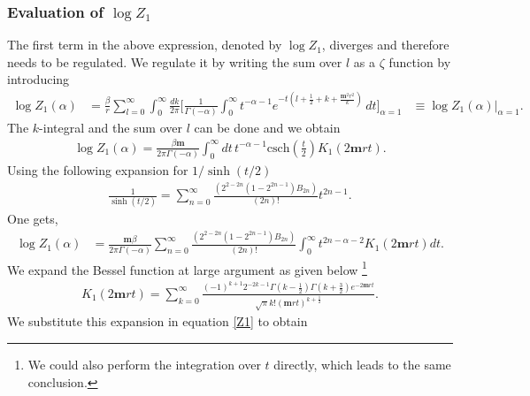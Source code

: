 \documentclass[a4paper,11pt]{article}
\begin{document}
\subsubsection*{Evaluation of $\log Z_1$}

The first term in the above expression, denoted by $\log Z_1$, diverges and  therefore needs to be regulated. 
We regulate it by writing the sum over $l$ as a $\zeta$ function by introducing 
\begin{align}
	\log Z_1 (\alpha) &=\frac{\beta}{r} \sum_{l=0}^\infty \int_0^\infty\frac{dk}{2\pi}\Bigg[\frac{1}{\Gamma (-\alpha )}    \int_0^{\infty } t^{-\alpha -1} e^{-t \left(l+\frac{1}{2}+k+\frac{\mathbf m^2r^2}{k}\right)} \, dt\Bigg]_{\alpha=1}
	&\equiv \log Z_1(\alpha)|_{\alpha=1}.
\end{align}
The  $k$-integral and the sum over $l$ can be done and we obtain 
\begin{align}
	\log Z_1(\alpha)=\frac{\beta \mathbf m }{2 \pi  \Gamma (-\alpha )}\int_0^\infty dt\, t^{-\alpha -1} \text{csch}\left(\frac{t}{2}\right) K_1(2\mathbf m r t).
\end{align}
Using the following expansion for $1/\sinh(t/2)$
\begin{align}
	\frac{1}{\sinh(t/2)}=   \sum _{n=0}^{\infty } \frac{\left(2^{2-2 n} \left(1-2^{2 n-1}\right) B_{2 n}\right) }{(2 n)!}t^{2 n-1}.
\end{align}
One gets,
\begin{align}\label{Z1}
	\log Z_1(\alpha)&=\frac{\mathbf m\beta }{2\pi\Gamma (-\alpha )}  
	\sum _{n=0}^{\infty } \frac{\left(2^{2-2 n} \left(1-2^{2 n-1}\right) B_{2 n}\right) }{(2 n)!}
	\int_{0}^\infty t^{2n-\alpha -2}  K_1(2\mathbf m r t) dt.
\end{align}
We expand the Bessel  function at large argument  as given below \footnote{We could also perform the integration over $t$ directly, which 
	 leads to the same conclusion.}
\begin{align}
	K_1(2\mathbf mrt)=\sum_{k=0}^\infty \frac{(-1)^{k+1} 2^{-2 k-1} \Gamma \left(k-\frac{1}{2}\right) \Gamma \left(k+\frac{3}{2}\right) e^{-2 \mathbf mr t} }{\sqrt{\pi } k! (\mathbf m r t)^{k+\frac{1}{2}}}.
\end{align}
We substitute this expansion  in equation \eqref{Z1} to obtain
\end{document}
